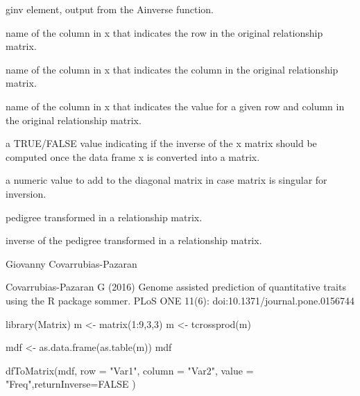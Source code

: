 \documentclass[a4paper]{book}
\begin{document}
\begin{Arguments}
\begin{ldescription}
\item[\code{x}] ginv element, output from the Ainverse function.
\item[\code{row}] name of the column in x that indicates the row in the original relationship matrix.
\item[\code{column}] name of the column in x that indicates the column in the original relationship matrix.
\item[\code{value}] name of the column in x that indicates the value for a given row and column in the original relationship matrix.
\item[\code{returnInverse}] a TRUE/FALSE value indicating if the inverse of the x matrix should be computed once the data frame x is converted into a matrix.
\item[\code{bend}] a numeric value to add to the diagonal matrix in case matrix is singular for inversion.
\end{ldescription}
\end{Arguments}
%
\begin{Value}

\begin{ldescription}
\item[\code{K}]  pedigree transformed in a relationship matrix.
\item[\code{Kinv}]  inverse of the pedigree transformed in a relationship matrix.

\end{ldescription}
\end{Value}
%
\begin{Author}\relax
Giovanny Covarrubias-Pazaran
\end{Author}
%
\begin{References}\relax
Covarrubias-Pazaran G (2016) Genome assisted prediction of quantitative traits using the R package sommer. PLoS ONE 11(6): doi:10.1371/journal.pone.0156744 

\end{References}
%
\begin{Examples}
\begin{ExampleCode}

library(Matrix)
m <- matrix(1:9,3,3)
m <- tcrossprod(m)

mdf <- as.data.frame(as.table(m))
mdf

dfToMatrix(mdf, row = "Var1", column = "Var2", 
            value = "Freq",returnInverse=FALSE )


\end{ExampleCode}
\end{Examples}
\end{document}
